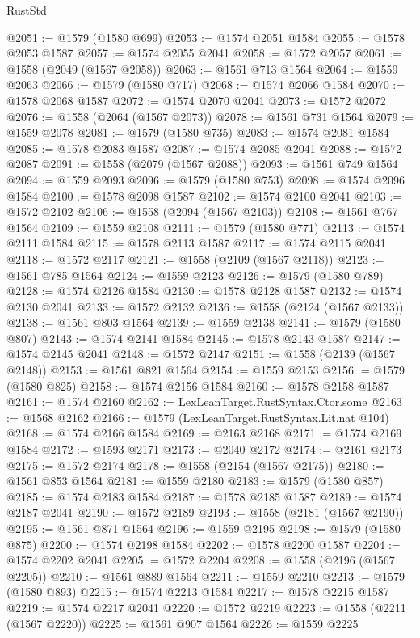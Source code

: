 \begin{lexlean}{RustStd}
\begin{coremodule}
@2051 := @1579 (@1580 @699)
@2053 := @1574 @2051 @1584
@2055 := @1578 @2053 @1587
@2057 := @1574 @2055 @2041
@2058 := @1572 @2057
@2061 := @1558 (@2049 (@1567 @2058))
@2063 := @1561 @713 @1564
@2064 := @1559 @2063
@2066 := @1579 (@1580 @717)
@2068 := @1574 @2066 @1584
@2070 := @1578 @2068 @1587
@2072 := @1574 @2070 @2041
@2073 := @1572 @2072
@2076 := @1558 (@2064 (@1567 @2073))
@2078 := @1561 @731 @1564
@2079 := @1559 @2078
@2081 := @1579 (@1580 @735)
@2083 := @1574 @2081 @1584
@2085 := @1578 @2083 @1587
@2087 := @1574 @2085 @2041
@2088 := @1572 @2087
@2091 := @1558 (@2079 (@1567 @2088))
@2093 := @1561 @749 @1564
@2094 := @1559 @2093
@2096 := @1579 (@1580 @753)
@2098 := @1574 @2096 @1584
@2100 := @1578 @2098 @1587
@2102 := @1574 @2100 @2041
@2103 := @1572 @2102
@2106 := @1558 (@2094 (@1567 @2103))
@2108 := @1561 @767 @1564
@2109 := @1559 @2108
@2111 := @1579 (@1580 @771)
@2113 := @1574 @2111 @1584
@2115 := @1578 @2113 @1587
@2117 := @1574 @2115 @2041
@2118 := @1572 @2117
@2121 := @1558 (@2109 (@1567 @2118))
@2123 := @1561 @785 @1564
@2124 := @1559 @2123
@2126 := @1579 (@1580 @789)
@2128 := @1574 @2126 @1584
@2130 := @1578 @2128 @1587
@2132 := @1574 @2130 @2041
@2133 := @1572 @2132
@2136 := @1558 (@2124 (@1567 @2133))
@2138 := @1561 @803 @1564
@2139 := @1559 @2138
@2141 := @1579 (@1580 @807)
@2143 := @1574 @2141 @1584
@2145 := @1578 @2143 @1587
@2147 := @1574 @2145 @2041
@2148 := @1572 @2147
@2151 := @1558 (@2139 (@1567 @2148))
@2153 := @1561 @821 @1564
@2154 := @1559 @2153
@2156 := @1579 (@1580 @825)
@2158 := @1574 @2156 @1584
@2160 := @1578 @2158 @1587
@2161 := @1574 @2160
@2162 := LexLeanTarget.RustSyntax.Ctor.some
@2163 := @1568 @2162
@2166 := @1579 (LexLeanTarget.RustSyntax.Lit.nat @104)
@2168 := @1574 @2166 @1584
@2169 := @2163 @2168
@2171 := @1574 @2169 @1584
@2172 := @1593 @2171
@2173 := @2040 @2172
@2174 := @2161 @2173
@2175 := @1572 @2174
@2178 := @1558 (@2154 (@1567 @2175))
@2180 := @1561 @853 @1564
@2181 := @1559 @2180
@2183 := @1579 (@1580 @857)
@2185 := @1574 @2183 @1584
@2187 := @1578 @2185 @1587
@2189 := @1574 @2187 @2041
@2190 := @1572 @2189
@2193 := @1558 (@2181 (@1567 @2190))
@2195 := @1561 @871 @1564
@2196 := @1559 @2195
@2198 := @1579 (@1580 @875)
@2200 := @1574 @2198 @1584
@2202 := @1578 @2200 @1587
@2204 := @1574 @2202 @2041
@2205 := @1572 @2204
@2208 := @1558 (@2196 (@1567 @2205))
@2210 := @1561 @889 @1564
@2211 := @1559 @2210
@2213 := @1579 (@1580 @893)
@2215 := @1574 @2213 @1584
@2217 := @1578 @2215 @1587
@2219 := @1574 @2217 @2041
@2220 := @1572 @2219
@2223 := @1558 (@2211 (@1567 @2220))
@2225 := @1561 @907 @1564
@2226 := @1559 @2225

\end{coremodule}
\end{lexlean}
